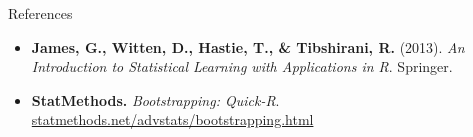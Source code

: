 \documentclass[
  ignorenonframetext,
]{beamer}
\begin{document}
\begin{frame}{References}
\label{references}
\begin{itemize}
\item
  \textbf{James, G., Witten, D., Hastie, T., \& Tibshirani, R.} (2013).
  \emph{An Introduction to Statistical Learning with Applications in R}.
  Springer.
\item
  \textbf{StatMethods.} \emph{Bootstrapping: Quick-R}.
  \href{https://www.statmethods.net/advstats/bootstrapping.html}{statmethods.net/advstats/bootstrapping.html}
\end{itemize}
\end{frame}

\begin{frame}
\end{frame}
\end{document}
